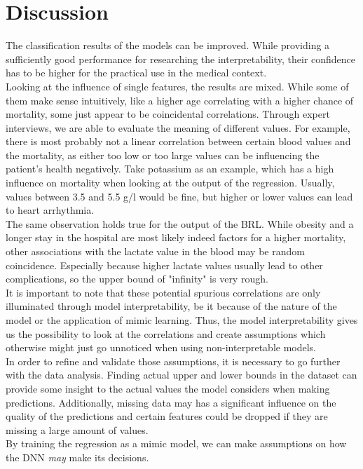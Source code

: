\documentclass[conference,comsoc]{IEEEtran}
\begin{document}
\clearpage
\section{Discussion}
\label{sec:discussion}
The classification results of the models can be improved.
While providing a sufficiently good performance for researching the interpretability, their confidence has to be higher for the practical use in the medical context. \\
Looking at the influence of single features, the results are mixed.
While some of them make sense intuitively, like a higher age correlating with a higher chance of mortality, some just appear to be coincidental correlations.
Through expert interviews, we are able to evaluate the meaning of different values.
For example, there is most probably not a linear correlation between certain blood values and the mortality, as either too low or too large values can be influencing the patient's health negatively.
Take potassium as an example, which has a high influence on mortality when looking at the output of the regression.
Usually, values between 3.5 and 5.5 \textmu g/l would be fine, but higher or lower values can lead to heart arrhythmia. \\
The same observation holds true for the output of the BRL.
While obesity and a longer stay in the hospital are most likely indeed factors for a higher mortality, other associations with the lactate value in the blood may be random coincidence.
Especially because higher lactate values usually lead to other complications, so the upper bound of "infinity" is very rough. \\
It is important to note that these potential spurious correlations are only illuminated through model interpretability, be it because of the nature of the model or the application of mimic learning.
Thus, the model interpretability gives us the possibility to look at the correlations and create assumptions which otherwise might just go unnoticed when using non-interpretable models. \\
In order to refine and validate those assumptions, it is necessary to go further with the data analysis.
Finding actual upper and lower bounds in the dataset can provide some insight to the actual values the model considers when making predictions.
Additionally, missing data may has a significant influence on the quality of the predictions and certain features could be dropped if they are missing a large amount of values. \\
By training the regression as a mimic model, we can make assumptions on how the DNN \emph{may} make its decisions.
\end{document}
